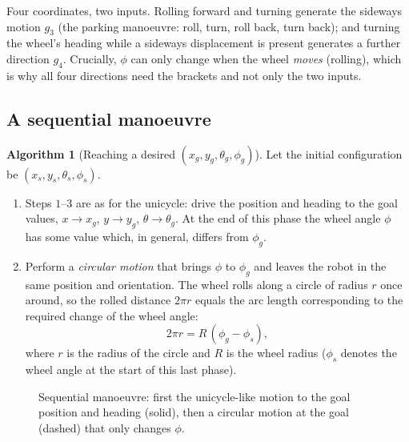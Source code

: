 \documentclass[11pt,a4paper]{article}
\def\bm#1{#1}%
\theoremstyle{definition}
\newtheorem{algorithm}[definition]{Algorithm}
\theoremstyle{plain}
\theoremstyle{remark}
\begin{document}
\begin{intuition}
Four coordinates, two inputs. Rolling forward and turning generate the sideways motion $\bm g_3$ (the parking manoeuvre: roll, turn, roll back, turn back); and turning the wheel's heading while a sideways displacement is present generates a further direction $\bm g_4$. Crucially, $\phi$ can only change when the wheel \emph{moves} (rolling), which is why all four directions need the brackets and not only the two inputs.
\end{intuition}

\subsection{A sequential manoeuvre}

\begin{algorithm}[Reaching a desired $(x_g,y_g,\theta_g,\phi_g)$]\label{alg:rollwheel}
Let the initial configuration be $(x_s,y_s,\theta_s,\phi_s)$.
\begin{enumerate}[nosep]
 \item Steps $1$--$3$ are as for the unicycle: drive the position and heading to the goal values, $x\to x_g$, $y\to y_g$, $\theta\to\theta_g$. At the end of this phase the wheel angle $\phi$ has some value which, in general, differs from $\phi_g$.
 \item Perform a \emph{circular motion} that brings $\phi$ to $\phi_g$ and leaves the robot in the same position and orientation. The wheel rolls along a circle of radius $r$ once around, so the rolled distance $2\pi r$ equals the arc length corresponding to the required change of the wheel angle:
 \[
   2\pi r=R\,(\phi_g-\phi_s),
 \]
 where $r$ is the radius of the circle and $R$ is the wheel radius ($\phi_s$ denotes the wheel angle at the start of this last phase).
\end{enumerate}
\end{algorithm}

\begin{figure}[ht]
\centering
{}
\caption{Sequential manoeuvre: first the unicycle-like motion to the goal position and heading (solid), then a circular motion at the goal (dashed) that only changes $\phi$.}
\end{figure}
\end{document}
